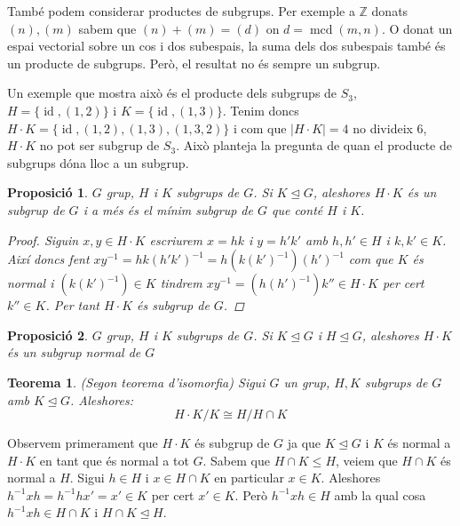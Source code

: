 \documentclass[a4paper,11pt]{report}
\newcommand{\inv}[1]{#1^{-1}}
\DeclareMathOperator{\mcd}{mcd}
\DeclareMathOperator{\id}{id}
\theoremstyle{theorem}
\newtheorem{proposicio}{\normalfont \sffamily\bfseries Proposició}[section]
\newtheorem{teorema}{\normalfont \sffamily\bfseries Teorema}[section]
\theoremstyle{definition}
\begin{document}
També podem considerar productes de subgrups. Per exemple a $\mathbb{Z}$ donats $(n), (m)$ sabem que $(n)+(m)=(d)$ on $d=\mcd(m,n)$. O donat un espai vectorial sobre un cos i dos subespais, la suma dels dos subespais també és un producte de subgrups. Però, el resultat no és sempre un subgrup.

Un exemple que mostra això és el producte dels subgrups de $S_3$, $H=\{\id,(1,2)\}$ i $K=\{\id,(1,3)\}$. Tenim doncs $H\cdot K=\{\id,(1,2),(1,3),(1,3,2)\}$ i com que $|H\cdot K|=4$ no divideix 6, $H\cdot K$ no pot ser subgrup de $S_3$. Això planteja la pregunta de quan el producte de subgrups dóna lloc a un subgrup.
\begin{proposicio}
	$G$ grup, $H$ i $K$ subgrups de $G$. Si $K\unlhd G$, aleshores $H\cdot K$ és un subgrup de $G$ i a més és el mínim subgrup de $G$ que conté $H$ i $K$.
	\begin{proof}
		Siguin $x,y\in H\cdot K$ escriurem $x=hk$ i $y=h'k'$ amb $h,h'\in H$ i $k,k'\in K$. Així doncs fent $x\inv{y}=hk\inv{(h'k')}=h(k\inv{(k')})\inv{(h')}$ com que $K$ és normal i $(k\inv{(k')})\in K$ tindrem $x\inv{y}=(h\inv{(h')})k''\in H\cdot K$ per cert $k''\in K$. Per tant $H\cdot K$ és subgrup de $G$.
	\end{proof}
\end{proposicio}
\begin{proposicio}
	$G$ grup, $H$ i $K$ subgrups de $G$. Si $K\unlhd G$ i $H\unlhd G$, aleshores $H\cdot K$ és un subgrup normal de $G$
\end{proposicio}
\begin{teorema}{(Segon teorema d'isomorfia)} Sigui $G$ un grup, $H,K$ subgrups de $G$ amb $K\unlhd G$. Aleshores:
$$H\cdot K/K\cong H/H\cap K$$
\end{teorema}
Observem primerament que $H\cdot K$ és subgrup de $G$ ja que $K\unlhd G$ i $K$ és normal a $H\cdot K$ en tant que és normal a tot $G$. Sabem que $H\cap K\leq H$, veiem que $H\cap K$ és normal a $H$. Sigui $h\in H$ i $x\in H\cap K$ en particular $x\in K$. Aleshores $\inv{h}xh=\inv{h}hx'=x'\in K$ per cert $x'\in K$. Però $\inv{h}xh\in H$ amb la qual cosa $\inv{h}xh \in H\cap K$ i $H\cap K\unlhd H$.
\end{document}
